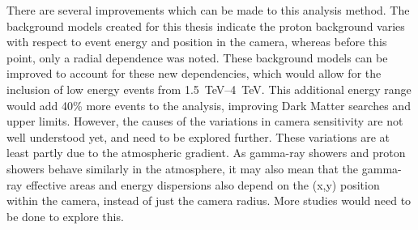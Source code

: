 There are several improvements which can be made to this analysis method.
The background models created for this thesis indicate the proton background varies with respect to event energy and position in the camera, whereas before this point, only a radial dependence was noted.
These background models can be improved to account for these new dependencies, which would allow for the inclusion of low energy events from \SIrange{1.5}{4}{TeV}.
This additional energy range would add \nicetilde{}40\% more events to the analysis, improving Dark Matter searches and upper limits.
However, the causes of the variations in camera sensitivity are not well understood yet, and need to be explored further.
These variations are at least partly due to the atmospheric gradient.
As gamma-ray showers and proton showers behave similarly in the atmosphere, it may also mean that the gamma-ray effective areas and energy dispersions also depend on the (x,y) position within the camera, instead of just the camera radius.
More studies would need to be done to explore this.

